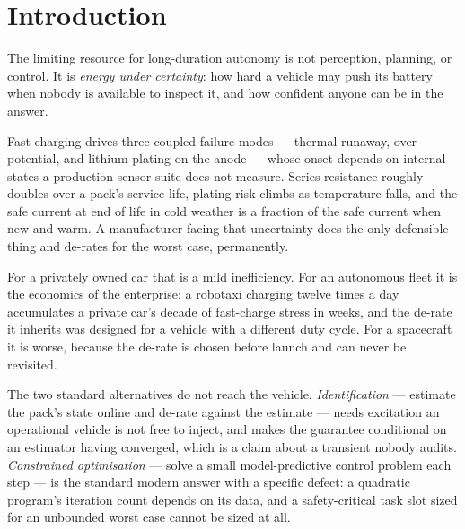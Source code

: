 \documentclass[11pt,letterpaper]{article}
\theoremstyle{definition}
\theoremstyle{remark}
\newcommand{\SI}[2]{#1\,#2}
\newcommand{\micro}{$\mu$}
\begin{document}
\begin{abstract}
two assumptions against \nCells{} cells measured by another laboratory, the filter against a
Doyle--Fuller--Newman plant on charge and on discharge, and the generality against a
\SI{\mtPower}{kW} permanent-magnet traction motor certified by the identical code at the same proved
cost. The filter compiles to \SI{\fwText}{B} and \SI{\fwRam}{B} of RAM, worst case
\SI{\fwUsMax}{\micro s}. Across \vPlatforms{} platforms in four media and \vExperiments{} experiments totalling
\vTotalEpisodes{} episodes nothing was breached while the certificate reported feasible.
Twenty-one experiments contradicted the hypothesis they were written to test and are reported as
findings, among them two media of four where the incumbent is not beaten and a cycle-life benefit
that DFN degradation does not support.
\end{abstract}
\section{Introduction}\label{sec:intro}

The limiting resource for long-duration autonomy is not perception, planning, or control. It is
\emph{energy under certainty}: how hard a vehicle may push its battery when nobody is available
to inspect it, and how confident anyone can be in the answer.

Fast charging drives three coupled failure modes --- thermal runaway, over-potential, and lithium
plating on the anode --- whose onset depends on internal states a production sensor suite does not
measure. Series resistance roughly doubles over a pack's service life, plating risk climbs as
temperature falls, and the safe current at end of life in cold weather is a fraction of the safe
current when new and warm. A manufacturer facing that uncertainty does the only defensible thing
and de-rates for the worst case, permanently.

For a privately owned car that is a mild inefficiency. For an autonomous fleet it is the
economics of the enterprise: a robotaxi charging twelve times a day accumulates a private car's
decade of fast-charge stress in \gWeeks{} weeks, and the de-rate it inherits was designed for a
vehicle with a different duty cycle. For a spacecraft it is worse, because the de-rate is chosen
before launch and can never be revisited.

The two standard alternatives do not reach the vehicle. \emph{Identification} --- estimate the
pack's state online and de-rate against the estimate --- needs excitation an operational vehicle
is not free to inject, and makes the guarantee conditional on an estimator having converged,
which is a claim about a transient nobody audits. \emph{Constrained optimisation} --- solve a
small model-predictive control problem each step --- is the standard modern answer with a
specific defect: a quadratic program's iteration count depends on its data, and a safety-critical
task slot sized for an unbounded worst case cannot be sized at all.
\end{document}
